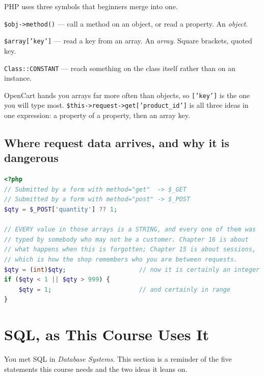 \begin{conceptbox}
PHP uses three symbols that beginners merge into one.

\begin{tight}
  \item \texttt{\$obj->method()} --- call a method on an object, or read a
        property. An \emph{object}.
  \item \texttt{\$array['key']} --- read a key from an array. An \emph{array}.
        Square brackets, quoted key.
  \item \texttt{Class::CONSTANT} --- reach something on the class itself rather
        than on an instance.
\end{tight}

\smallskip
OpenCart hands you arrays far more often than objects, so \texttt{['key']} is
the one you will type most. \texttt{\$this->request->get['product\_id']} is all
three ideas in one expression: a property of a property, then an array key.
\end{conceptbox}

\subsection{Where request data arrives, and why it is dangerous}

\begin{lstlisting}[language=php]
<?php
// Submitted by a form with method="get"  -> $_GET
// Submitted by a form with method="post" -> $_POST
$qty = $_POST['quantity'] ?? 1;

// EVERY value in those arrays is a STRING, and every one of them was
// typed by somebody who may not be a customer. Chapter 16 is about
// what happens when this is forgotten; Chapter 15 is about sessions,
// which is how the shop remembers who you are between requests.
$qty = (int)$qty;                    // now it is certainly an integer
if ($qty < 1 || $qty > 999) {
    $qty = 1;                        // and certainly in range
}
\end{lstlisting}

\section{SQL, as This Course Uses It}

You met SQL in \emph{Database Systems}. This section is a reminder of the five
statements this course needs and the two ideas it leans on.

